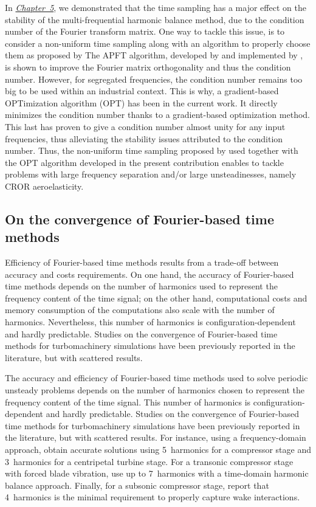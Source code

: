 In \hyperref[cha:limitations_condition_number]{\emph{Chapter~5}},
we demonstrated that the time sampling has a major effect on the
stability of the multi-frequential harmonic balance 
method, due to the condition number of the Fourier
transform matrix. One way to tackle this issue, 
is to consider a non-uniform time sampling
along with an algorithm to properly choose them
as proposed by \citet{ThesisGuedeney}
The APFT algorithm, developed
by \citet{Kundert1988} and implemented by 
\citet{ThesisGuedeney}, is shown to improve the
Fourier matrix orthogonality and thus the condition number.
However, for segregated frequencies, the condition number
remains too big to be used within an industrial context.
This is why, a gradient-based OPTimization algorithm (OPT) 
has been in the current work.
It directly minimizes the condition number thanks to a
gradient-based optimization method. This last has proven to
give a condition number almost unity for any input frequencies,
thus alleviating the stability issues attributed to 
the condition number.
Thus, the non-uniform time sampling proposed by \citet{ThesisGuedeney}
used together with the OPT algorithm 
developed in the present contribution
enables to tackle problems with large frequency 
separation and/or large unsteadinesses, namely CROR aeroelasticity.

\subsection*{On the convergence of Fourier-based time methods}

Efficiency of Fourier-based time methods results 
from a trade-off between accuracy and 
costs requirements.
On one hand, the accuracy of Fourier-based
time methods depends on the number of harmonics
used to represent the frequency content of the time 
signal; on the other hand, computational costs and 
memory consumption of the computations also scale
with the number of harmonics. 
Nevertheless, this number of harmonics is configuration-dependent 
and hardly predictable. Studies on the convergence of 
Fourier-based time methods for turbomachinery simulations 
have been previously reported in the literature, 
but with scattered results. 

The accuracy and efficiency of Fourier-based time methods 
used to solve periodic unsteady problems depends on the number of harmonics
chosen to represent the frequency content of the time signal.
This number of harmonics is configuration-dependent 
and hardly predictable. Studies on the convergence of 
Fourier-based time methods for turbomachinery simulations 
have been previously reported in the literature, 
but with scattered results. 
For instance, using a frequency-domain approach, 
\citet{Vilmin2006} obtain accurate solutions 
using 5~harmonics for a compressor stage and 3~harmonics for a 
centripetal turbine stage. For a transonic compressor stage with 
forced blade vibration, \citet{ekici2010} use 
up to 7~harmonics with a time-domain harmonic balance approach. Finally, for a 
subsonic compressor stage, \citet{JSicot2012} report 
that 4~harmonics is the minimal requirement 
to properly capture wake interactions. 

